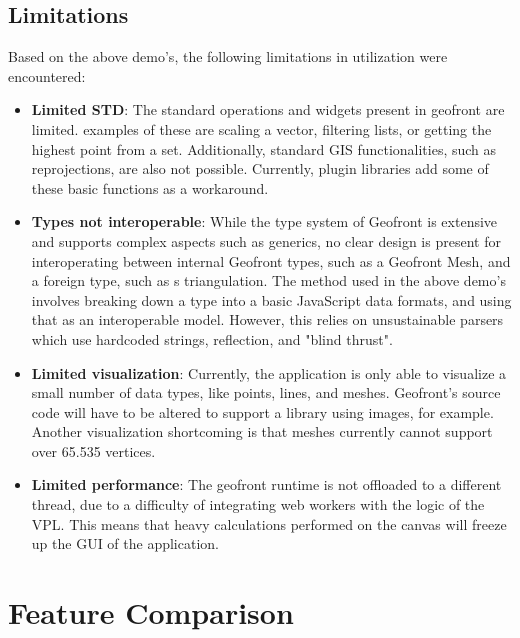 \subsection{Limitations}

Based on the above demo's, the following limitations in utilization were encountered: 
\begin{itemize}
  \item \textbf{Limited STD}: The standard operations and widgets present in geofront are limited. 
  examples of these are scaling a vector, filtering lists, or getting the highest point from a set.
  Additionally, standard \ac{GIS} functionalities, such as reprojections, are also not possible. 
  Currently, plugin libraries add some of these basic functions as a workaround.    

  \item \textbf{Types not interoperable}: While the type system of Geofront is extensive and supports complex aspects such as generics, no clear design is present for interoperating between internal Geofront types, such as a Geofront Mesh, and a foreign type, such as s triangulation. 
  The method used in the above demo's involves breaking down a type into a basic JavaScript data formats, and using that as an interoperable model. 
  However, this relies on unsustainable parsers which use hardcoded strings, reflection, and "blind thrust".

  \item \textbf{Limited visualization}: Currently, the application is only able to visualize a small number of data types, like points, lines, and meshes. Geofront's source code will have to be altered to support a library using images, for example.
  Another visualization shortcoming is that meshes currently cannot support over 65.535 vertices. 
  
  \item \textbf{Limited performance}: The geofront runtime is not offloaded to a different thread, due to a difficulty of integrating web workers with the logic of the VPL. 
  This means that heavy calculations performed on the canvas will freeze up the \ac{GUI} of the application. 
 
\end{itemize} 



\section{Feature Comparison}
\label{sec:testing:features}

